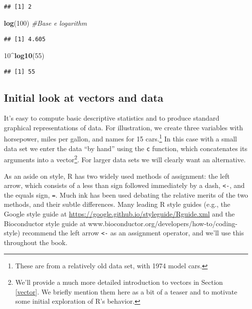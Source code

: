 \documentclass[
]{krantz}
\newenvironment{Shaded}{\begin{snugshade}}{\end{snugshade}}
\newcommand{\CommentTok}[1]{\textcolor[rgb]{0.56,0.35,0.01}{\textit{#1}}}
\newcommand{\DecValTok}[1]{\textcolor[rgb]{0.00,0.00,0.81}{#1}}
\newcommand{\KeywordTok}[1]{\textcolor[rgb]{0.13,0.29,0.53}{\textbf{#1}}}
\newcommand{\NormalTok}[1]{#1}
\newcommand{\OperatorTok}[1]{\textcolor[rgb]{0.81,0.36,0.00}{\textbf{#1}}}
\begin{document}
\begin{verbatim}
## [1] 2
\end{verbatim}

\begin{Shaded}
\begin{Highlighting}[]
\KeywordTok{log}\NormalTok{(}\DecValTok{100}\NormalTok{)  }\CommentTok{\#Base e logarithm}
\end{Highlighting}
\end{Shaded}

\begin{verbatim}
## [1] 4.605
\end{verbatim}

\begin{Shaded}
\begin{Highlighting}[]
\DecValTok{10}\OperatorTok{\^{}}\KeywordTok{log10}\NormalTok{(}\DecValTok{55}\NormalTok{)}
\end{Highlighting}
\end{Shaded}

\begin{verbatim}
## [1] 55
\end{verbatim}

\hypertarget{RDescriptive}{%
\subsection{Initial look at vectors and data}\label{RDescriptive}}

It's easy to compute basic descriptive statistics and to produce standard graphical representations of data. For illustration, we create three variables with horsepower, miles per gallon, and names for 15 cars.\footnote{These are from a relatively old data set, with 1974 model cars.} In this case with a small data set we enter the data ``by hand'' using the \texttt{c} function, which concatenates its arguments into a vector\footnote{We'll provide a much more detailed introduction to vectors in Section \ref{vector}. We briefly mention them here as a bit of a teaser and to motivate some initial exploration of R's behavior.}. For larger data sets we will clearly want an alternative.

As an aside on style, R has two widely used methods of assignment: the left arrow, which consists of a less than sign followed immediately by a dash, \texttt{\textless{}-}, and the equals sign, \texttt{=}. Much ink has been used debating the relative merits of the two methods, and their subtle differences. Many leading R style guides (e.g., the Google style guide at \url{https://google.github.io/styleguide/Rguide.xml} and the Bioconductor style guide at www.bioconductor.org/developers/how-to/coding-style) recommend the left arrow \texttt{\textless{}-} as an assignment operator, and we'll use this throughout the book.
\end{document}
